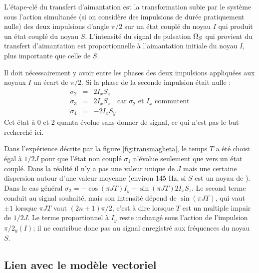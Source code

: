 L'étape-clé du transfert d'aimantation est la transformation 
subie par le système sous l'action simultanée 
(si on considère des impulsions de durée pratiquement nulle)
des deux impulsions d'angle $\pi/2$ sur un état couplé du noyau $I$
qui produit un état couplé du noyau $S$.
L'intensité du signal de pulsation $\Omega_S$ qui provient du 
transfert d'aimantation est proportionnelle à l'aimantation initiale 
du noyau $I$, plus importante que celle de $S$.

Il doit nécessairement y avoir entre les phases des deux impulsions 
appliquées aux noyaux $I$ un écart de $\pi/2$.
Si la phase de la seconde impulsion était nulle :
\begin{eqnarray}
\sigma_2 & = & 2I_xS_z \\
\sigma_3 & = & 2I_xS_z \quad \mbox{car $\sigma_2$ et $I_x$ commutent} \\
\sigma_4 & = & -2I_xS_y
\end{eqnarray}
Cet état à 0 et 2 quanta évolue sans donner de signal, ce qui n'est
pas le but recherché ici.

Dans l'expérience décrite par la figure \ref{fig:transmagheta}, 
le temps $T$ a été choisi égal à $1/2J$ pour que l'état non couplé
$\sigma_1$ n'évolue seulement que vers un état couplé. 
Dans la réalité il n'y a pas une valeur unique de $J$ mais une certaine dispersion
autour d'une valeur moyenne (environ 145 Hz, si $S$ est un noyau de \carb).
Dans le cas général $\sigma_2 = -\cos(\pi J T)I_y + \sin(\pi J T)2I_xS_z$.
Le second terme conduit au signal souhaité, mais son intensité dépend de $\sin(\pi J T)$,
qui vaut $\pm 1$ lorsque $\pi J T$ vaut $(2n+1)\pi/2$, c'est à dire lorsque $T$
est un multiple impair de $1/2J$. 
Le terme proportionnel à $I_y$ reste inchangé sous l'action de l'impulsion 
$\pi/2_y(I)$; il ne contribue donc pas au signal enregistré aux fréquences du noyau $S$.

\subsection{Lien avec le modèle vectoriel}

